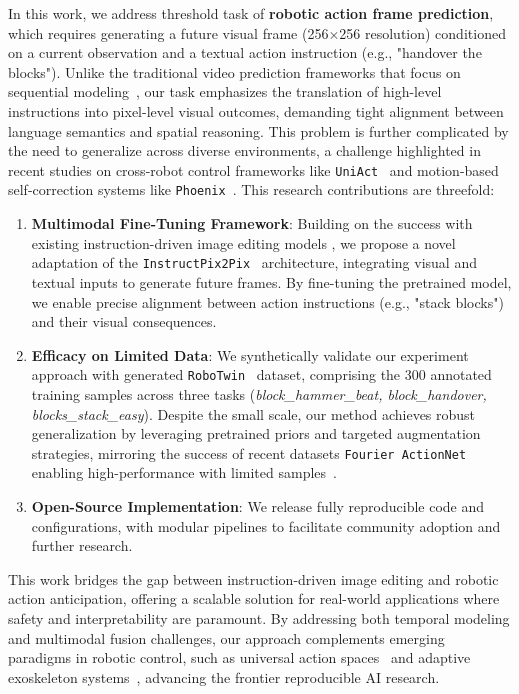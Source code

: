 In this work, we address threshold task of \textbf{robotic action frame prediction}, 
  which requires generating a future visual frame (256$\times$256 resolution) 
    conditioned on a current observation and a textual action instruction 
    (e.g., "handover the blocks"). 
Unlike the traditional video prediction frameworks 
  that focus on sequential modeling~\cite{TimeSeriesPredictiveControlRobotics2024}, 
    our task emphasizes the translation of high-level instructions 
      into pixel-level visual outcomes, 
        demanding tight alignment between language semantics and spatial reasoning.
This problem is further complicated by the need to generalize across diverse environments, 
  a challenge highlighted in recent studies on cross-robot control frameworks 
    like \texttt{UniAct}~\cite{zheng2025universalactionsenhancedembodied}
    and motion-based self-correction systems like \texttt{Phoenix}~\cite{xia2025phoenixmotionbasedselfreflectionframework}.
This research contributions are threefold:
\begin{enumerate}
  \item \textbf{Multimodal Fine-Tuning Framework}: 
  Building on the success with existing instruction-driven image editing models
    \cite{liu2025bidirectional,xia2025phoenixmotionbasedselfreflectionframework},
    we propose a novel adaptation of the \texttt{InstructPix2Pix}~\cite{brooks2023instructpix2pixlearningfollowimage} architecture, 
    integrating visual and textual inputs to generate future frames. 
  By fine-tuning the pretrained model, 
    we enable precise alignment between action instructions 
    (e.g., "stack blocks") and their visual consequences.
  \item \textbf{Efficacy on Limited Data}: 
  We synthetically validate our experiment approach with generated \texttt{RoboTwin}~\cite{mu2025robotwindualarmrobotbenchmark} dataset, 
    comprising the 300 annotated training samples across three tasks 
    (\textit{block\_hammer\_beat, block\_handover, blocks\_stack\_easy}). 
  Despite the small scale, our method achieves robust generalization 
    by leveraging pretrained priors and targeted augmentation strategies,
    mirroring the success of recent datasets \texttt{Fourier ActionNet}
      enabling high-performance with limited samples~\cite{fourier2025actionnet}.
  \item \textbf{Open-Source Implementation}: 
  We release fully reproducible code and configurations, 
    with modular pipelines to facilitate community adoption and further research.
\end{enumerate}

\noindent
This work bridges the gap between instruction-driven image editing and robotic action anticipation, 
  offering a scalable solution for real-world applications 
    where safety and interpretability are paramount.
By addressing both temporal modeling and multimodal fusion challenges, 
  our approach complements emerging paradigms in robotic control, 
    such as universal action spaces~\cite{zheng2025universalactionsenhancedembodied} 
    and adaptive exoskeleton systems~\cite{Wang2025LevelGround}, 
      advancing the frontier reproducible AI research.